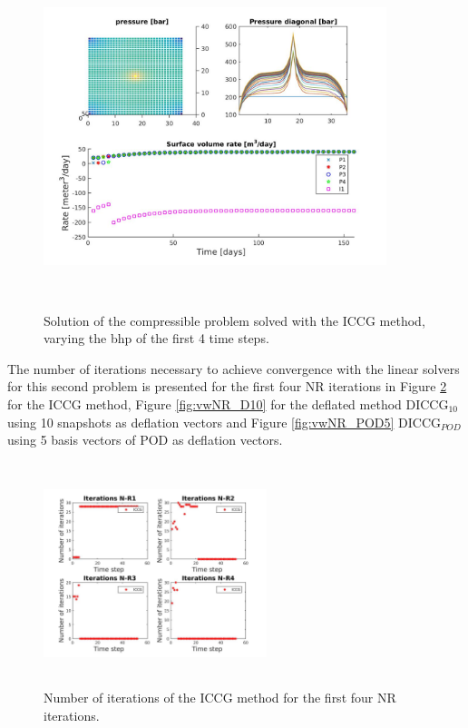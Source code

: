 \documentclass[12pt]{article}
\begin{document}
\begin{figure}[!h]
\centering
\begin{minipage}{.7\textwidth}
 \centering
\includegraphics[width=10cm,height=10cm,keepaspectratio]
{solutionvw_IC.jpg}
\caption{Solution of the compressible problem solved with the ICCG method, varying the bhp of the first 4 time steps.}
\label{fig:compsolvw}
\end{minipage}
\end{figure}
The number of iterations necessary to achieve convergence with the linear solvers for this second problem is presented for the first four NR iterations in Figure \ref{fig:vwNR_IC} for the ICCG method, Figure \ref{fig:vwNR_D10} for the deflated method DICCG$_{10}$ using 10 snapshots as deflation vectors and Figure \ref{fig:vwNR_POD5} DICCG$_{POD}$ using 5 basis vectors of POD as deflation vectors. 
\begin{figure}[!h]
\centering
\begin{minipage}{.4\textwidth}
 \centering
\includegraphics[width=6.5cm,height=6.5cm,keepaspectratio]
{iterations_4NRvw_IC.jpg}
\caption{Number of iterations of the ICCG method for the first four NR iterations.}
\label{fig:vwNR_IC}
\end{minipage}
\end{figure}
\end{document}
